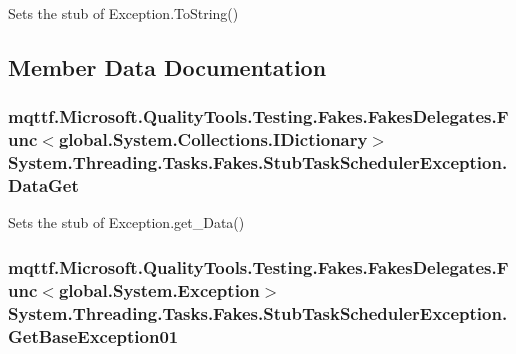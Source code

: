 Sets the stub of Exception.\-To\-String()



\subsection{Member Data Documentation}
\hypertarget{class_system_1_1_threading_1_1_tasks_1_1_fakes_1_1_stub_task_scheduler_exception_a87df55d011ab049be9cc1ff5def066c4}{
\subsubsection[{Data\-Get}]{\setlength{\rightskip}{0pt plus 5cm}mqttf.\-Microsoft.\-Quality\-Tools.\-Testing.\-Fakes.\-Fakes\-Delegates.\-Func$<$global.\-System.\-Collections.\-I\-Dictionary$>$ System.\-Threading.\-Tasks.\-Fakes.\-Stub\-Task\-Scheduler\-Exception.\-Data\-Get}}\label{class_system_1_1_threading_1_1_tasks_1_1_fakes_1_1_stub_task_scheduler_exception_a87df55d011ab049be9cc1ff5def066c4}


Sets the stub of Exception.\-get\-\_\-\-Data()

\hypertarget{class_system_1_1_threading_1_1_tasks_1_1_fakes_1_1_stub_task_scheduler_exception_aaae803e4087f54b73bd7a7fe6d612302}{
\subsubsection[{Get\-Base\-Exception01}]{\setlength{\rightskip}{0pt plus 5cm}mqttf.\-Microsoft.\-Quality\-Tools.\-Testing.\-Fakes.\-Fakes\-Delegates.\-Func$<$global.\-System.\-Exception$>$ System.\-Threading.\-Tasks.\-Fakes.\-Stub\-Task\-Scheduler\-Exception.\-Get\-Base\-Exception01}}\label{class_system_1_1_threading_1_1_tasks_1_1_fakes_1_1_stub_task_scheduler_exception_aaae803e4087f54b73bd7a7fe6d612302}


